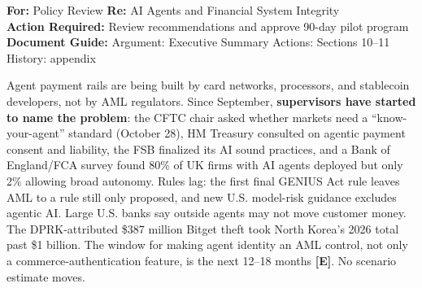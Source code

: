 \documentclass[11pt,letterpaper]{article}
\begin{document}
\begingroup\small{}
\begin{tcolorbox}[enhanced, colback=lightgray, colframe=emeralddeep!60, boxrule=1pt, arc=3pt,
  left=10pt, right=10pt, top=6pt, bottom=6pt]
\textbf{For:} Policy Review \quad\textbar\quad \textbf{Re:} AI Agents and Financial System Integrity\\
\textbf{Action Required:} Review recommendations and approve 90-day pilot program\\
\textbf{Document Guide:} Argument: Executive Summary \textbar{} Actions: Sections 10--11 \textbar{} History: appendix
\end{tcolorbox}


\begin{criticalbox}
Agent payment rails are being built by card networks, processors, and stablecoin developers, not by AML regulators. Since September, \textbf{supervisors have started to name the problem}: the CFTC chair asked whether markets need a ``know-your-agent'' standard (October 28), HM Treasury consulted on agentic payment consent and liability, the FSB finalized its AI sound practices, and a Bank of England/FCA survey found 80\% of UK firms with AI agents deployed but only 2\% allowing broad autonomy. Rules lag: the first final GENIUS Act rule leaves AML to a rule still only proposed, and new U.S. model-risk guidance excludes agentic AI. Large U.S. banks say outside agents may not move customer money. The DPRK-attributed \$387 million Bitget theft took North Korea's 2026 total past \$1 billion. The window for making agent identity an AML control, not only a commerce-authentication feature, is the next 12--18 months \textbf{[E]}. No scenario estimate moves.
\end{criticalbox}
\end{document}
